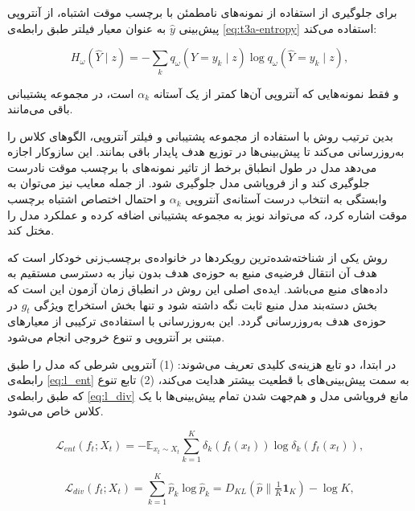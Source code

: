 برای جلوگیری از استفاده از نمونه‌های نامطمئن با برچسب موقت اشتباه،  از آنتروپی پیش‌بینی \(\hat{y}\) به عنوان معیار فیلتر طبق رابطه‌ی \ref{eq:t3a-entropy} استفاده می‌کند\cite{t3a}:

\begin{equation}
	H_\omega(\hat{Y} \mid z) = - \sum_k q_\omega(\hat{Y} = y_k \mid z) \log q_\omega(\hat{Y} = y_k \mid z),
	\label{eq:t3a-entropy}
\end{equation}

و فقط نمونه‌هایی که آنتروپی آن‌ها کمتر از یک آستانه \(\alpha_k\) است، در مجموعه پشتیبانی باقی می‌مانند.

بدین ترتیب روش   با استفاده از مجموعه پشتیبانی و فیلتر آنتروپی، الگوهای کلاس را به‌روزرسانی می‌کند تا پیش‌بینی‌ها در توزیع هدف پایدار باقی بمانند. این سازوکار اجازه می‌دهد مدل در طول انطباق برخط از تاثیر نمونه‌های با برچسب موقت نادرست جلوگیری کند و از فروپاشی مدل جلوگیری شود.
از جمله معایب  نیز می‌توان به وابستگی به انتخاب درست آستانه‌ی آنتروپی \(\alpha_k\) و احتمال اختصاص اشتباه برچسب موقت اشاره کرد، که می‌تواند نویز به مجموعه پشتیبانی اضافه کرده و عملکرد مدل را مختل کند.


روش  یکی از شناخته‌شده‌ترین رویکردها در خانواده‌ی برچسب‌زنی خودکار است که هدف آن انتقال {فرضیه‌ی منبع} به حوزه‌ی هدف بدون نیاز به دسترسی مستقیم به داده‌های منبع می‌باشد.   
ایده‌ی اصلی این روش در انطباق زمان آزمون این است که بخش دسته‌بند مدل منبع ثابت نگه داشته شود و تنها بخش استخراج ویژگی $g_t$ در حوزه‌ی هدف به‌روزرسانی گردد. این به‌روزرسانی با استفاده‌ی ترکیبی از معیارهای مبتنی بر آنتروپی و تنوع خروجی انجام می‌شود.  

در ابتدا، دو تابع هزینه‌ی کلیدی تعریف می‌شوند:  
(1) آنتروپی شرطی که مدل را طبق رابطه‌ی \ref{eq:l_ent} به سمت پیش‌بینی‌های با قطعیت بیشتر هدایت می‌کند\cite{shot}،  
(2) تابع تنوع که طبق رابطه‌ی \ref{eq:l_div} مانع فروپاشی مدل و هم‌جهت شدن تمام پیش‌بینی‌ها با یک کلاس خاص می‌شود\cite{shot}.  

\begin{equation}
	\label{eq:l_ent}
	\mathcal{L}_{ent}(f_t; X_t) = - \mathbb{E}_{x_t \sim X_t} \sum_{k=1}^{K} \delta_k(f_t(x_t)) \log \delta_k(f_t(x_t)),
\end{equation}

\begin{equation}
	\label{eq:l_div}
	\mathcal{L}_{div}(f_t; X_t) = \sum_{k=1}^{K} \hat{p}_k \log \hat{p}_k = D_{KL}(\hat{p} \parallel \tfrac{1}{K}\mathbf{1}_K) - \log K,
\end{equation}

